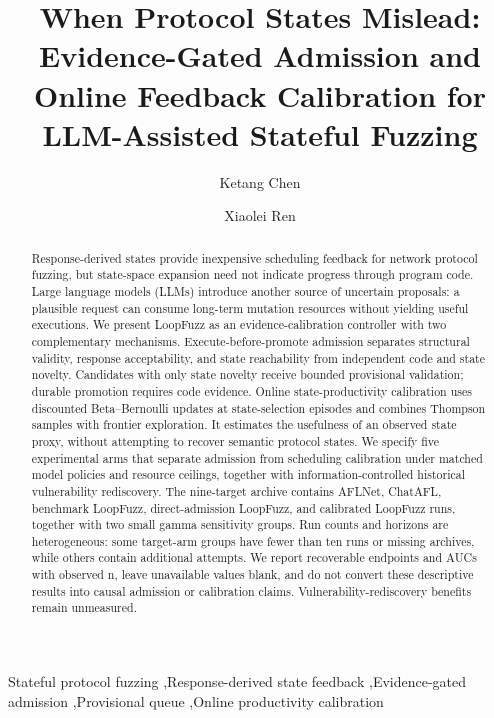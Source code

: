 \documentclass[final,5p,times,number]{elsarticle}
\begin{document}
\raggedbottom
\begin{frontmatter}
\title{When Protocol States Mislead: Evidence-Gated Admission and Online Feedback Calibration for LLM-Assisted Stateful Fuzzing}
\author[inst1]{Ketang Chen}
\author[inst1]{Xiaolei Ren}
\begin{abstract}
Response-derived states provide inexpensive scheduling feedback for network protocol fuzzing, but state-space expansion need not indicate progress through program code. Large language models (LLMs) introduce another source of uncertain proposals: a plausible request can consume long-term mutation resources without yielding useful executions. We present LoopFuzz as an evidence-calibration controller with two complementary mechanisms. Execute-before-promote admission separates structural validity, response acceptability, and state reachability from independent code and state novelty. Candidates with only state novelty receive bounded provisional validation; durable promotion requires code evidence. Online state-productivity calibration uses discounted Beta--Bernoulli updates at state-selection episodes and combines Thompson samples with frontier exploration. It estimates the usefulness of an observed state proxy, without attempting to recover semantic protocol states. We specify five experimental arms that separate admission from scheduling calibration under matched model policies and resource ceilings, together with information-controlled historical vulnerability rediscovery. The nine-target archive contains AFLNet, ChatAFL, benchmark LoopFuzz, direct-admission LoopFuzz, and calibrated LoopFuzz runs, together with two small gamma sensitivity groups. Run counts and horizons are heterogeneous: some target-arm groups have fewer than ten runs or missing archives, while others contain additional attempts. We report recoverable endpoints and AUCs with observed n, leave unavailable values blank, and do not convert these descriptive results into causal admission or calibration claims. Vulnerability-rediscovery benefits remain unmeasured.
\end{abstract}
\begin{keyword}
Stateful protocol fuzzing \sep Response-derived state feedback \sep Evidence-gated admission \sep Provisional queue \sep Online productivity calibration
\end{keyword}
\end{frontmatter}
\end{document}
